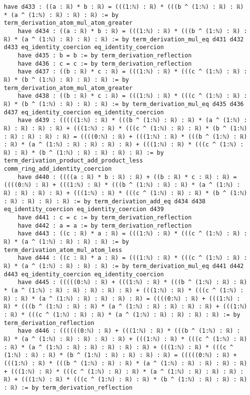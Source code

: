 \documentclass{article}
\begin{document}
\begin{tcolorbox}[colback=white!10, width=\linewidth]
\begin{lstlisting}[language=Lean4]
    have d433 : ((a : ℝ) * b : ℝ) = (((1:ℕ) : ℝ) * (((b ^ (1:ℕ) : ℝ) : ℝ) * (a ^ (1:ℕ) : ℝ) : ℝ) : ℝ) := by term_derivation_atom_mul_atom_greater
    have d434 : ((a : ℝ) * b : ℝ) = (((1:ℕ) : ℝ) * (((b ^ (1:ℕ) : ℝ) : ℝ) * (a ^ (1:ℕ) : ℝ) : ℝ) : ℝ) := by term_derivation_mul_eq d431 d432 d433 eq_identity_coercion eq_identity_coercion
    have d435 : b = b := by term_derivation_reflection
    have d436 : c = c := by term_derivation_reflection
    have d437 : ((b : ℝ) * c : ℝ) = (((1:ℕ) : ℝ) * (((c ^ (1:ℕ) : ℝ) : ℝ) * (b ^ (1:ℕ) : ℝ) : ℝ) : ℝ) := by term_derivation_atom_mul_atom_greater
    have d438 : ((b : ℝ) * c : ℝ) = (((1:ℕ) : ℝ) * (((c ^ (1:ℕ) : ℝ) : ℝ) * (b ^ (1:ℕ) : ℝ) : ℝ) : ℝ) := by term_derivation_mul_eq d435 d436 d437 eq_identity_coercion eq_identity_coercion
    have d439 : (((((1:ℕ) : ℝ) * (((b ^ (1:ℕ) : ℝ) : ℝ) * (a ^ (1:ℕ) : ℝ) : ℝ) : ℝ) : ℝ) + (((1:ℕ) : ℝ) * (((c ^ (1:ℕ) : ℝ) : ℝ) * (b ^ (1:ℕ) : ℝ) : ℝ) : ℝ) : ℝ) = ((((0:ℕ) : ℝ) + (((1:ℕ) : ℝ) * (((b ^ (1:ℕ) : ℝ) : ℝ) * (a ^ (1:ℕ) : ℝ) : ℝ) : ℝ) : ℝ) + (((1:ℕ) : ℝ) * (((c ^ (1:ℕ) : ℝ) : ℝ) * (b ^ (1:ℕ) : ℝ) : ℝ) : ℝ) : ℝ) := by term_derivation_product_add_product_less comm_ring_add_identity_coercion
    have d440 : ((((a : ℝ) * b : ℝ) : ℝ) + ((b : ℝ) * c : ℝ) : ℝ) = ((((0:ℕ) : ℝ) + (((1:ℕ) : ℝ) * (((b ^ (1:ℕ) : ℝ) : ℝ) * (a ^ (1:ℕ) : ℝ) : ℝ) : ℝ) : ℝ) + (((1:ℕ) : ℝ) * (((c ^ (1:ℕ) : ℝ) : ℝ) * (b ^ (1:ℕ) : ℝ) : ℝ) : ℝ) : ℝ) := by term_derivation_add_eq d434 d438 eq_identity_coercion eq_identity_coercion d439
    have d441 : c = c := by term_derivation_reflection
    have d442 : a = a := by term_derivation_reflection
    have d443 : ((c : ℝ) * a : ℝ) = (((1:ℕ) : ℝ) * (((c ^ (1:ℕ) : ℝ) : ℝ) * (a ^ (1:ℕ) : ℝ) : ℝ) : ℝ) := by term_derivation_atom_mul_atom_less
    have d444 : ((c : ℝ) * a : ℝ) = (((1:ℕ) : ℝ) * (((c ^ (1:ℕ) : ℝ) : ℝ) * (a ^ (1:ℕ) : ℝ) : ℝ) : ℝ) := by term_derivation_mul_eq d441 d442 d443 eq_identity_coercion eq_identity_coercion
    have d445 : (((((0:ℕ) : ℝ) + (((1:ℕ) : ℝ) * (((b ^ (1:ℕ) : ℝ) : ℝ) * (a ^ (1:ℕ) : ℝ) : ℝ) : ℝ) : ℝ) : ℝ) + (((1:ℕ) : ℝ) * (((c ^ (1:ℕ) : ℝ) : ℝ) * (a ^ (1:ℕ) : ℝ) : ℝ) : ℝ) : ℝ) = ((((0:ℕ) : ℝ) + (((1:ℕ) : ℝ) * (((b ^ (1:ℕ) : ℝ) : ℝ) * (a ^ (1:ℕ) : ℝ) : ℝ) : ℝ) : ℝ) + (((1:ℕ) : ℝ) * (((c ^ (1:ℕ) : ℝ) : ℝ) * (a ^ (1:ℕ) : ℝ) : ℝ) : ℝ) : ℝ) := by term_derivation_reflection
    have d446 : ((((((0:ℕ) : ℝ) + (((1:ℕ) : ℝ) * (((b ^ (1:ℕ) : ℝ) : ℝ) * (a ^ (1:ℕ) : ℝ) : ℝ) : ℝ) : ℝ) + (((1:ℕ) : ℝ) * (((c ^ (1:ℕ) : ℝ) : ℝ) * (a ^ (1:ℕ) : ℝ) : ℝ) : ℝ) : ℝ) : ℝ) + (((1:ℕ) : ℝ) * (((c ^ (1:ℕ) : ℝ) : ℝ) * (b ^ (1:ℕ) : ℝ) : ℝ) : ℝ) : ℝ) = (((((0:ℕ) : ℝ) + (((1:ℕ) : ℝ) * (((b ^ (1:ℕ) : ℝ) : ℝ) * (a ^ (1:ℕ) : ℝ) : ℝ) : ℝ) : ℝ) + (((1:ℕ) : ℝ) * (((c ^ (1:ℕ) : ℝ) : ℝ) * (a ^ (1:ℕ) : ℝ) : ℝ) : ℝ) : ℝ) + (((1:ℕ) : ℝ) * (((c ^ (1:ℕ) : ℝ) : ℝ) * (b ^ (1:ℕ) : ℝ) : ℝ) : ℝ) : ℝ) := by term_derivation_reflection

\end{lstlisting}
\end{tcolorbox}
\end{document}
